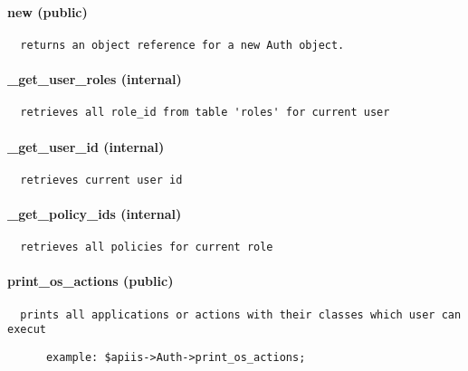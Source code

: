 \paragraph*{new (public)\label{Apiis::Auth::AppAuth_--_object_for_provading_data_about_user_access_rights_for_the_applications_new_public_}}
\begin{verbatim}
  returns an object reference for a new Auth object.
\end{verbatim}
\paragraph*{\_get\_user\_roles (internal)\label{Apiis::Auth::AppAuth_--_object_for_provading_data_about_user_access_rights_for_the_applications__get_user_roles_internal_}}
\begin{verbatim}
  retrieves all role_id from table 'roles' for current user
\end{verbatim}
\paragraph*{\_get\_user\_id (internal)\label{Apiis::Auth::AppAuth_--_object_for_provading_data_about_user_access_rights_for_the_applications__get_user_id_internal_}}
\begin{verbatim}
  retrieves current user id
\end{verbatim}
\paragraph*{\_get\_policy\_ids (internal)\label{Apiis::Auth::AppAuth_--_object_for_provading_data_about_user_access_rights_for_the_applications__get_policy_ids_internal_}}
\begin{verbatim}
  retrieves all policies for current role
\end{verbatim}
\paragraph*{print\_os\_actions (public)\label{Apiis::Auth::AppAuth_--_object_for_provading_data_about_user_access_rights_for_the_applications_print_os_actions_public_}}
\begin{verbatim}
  prints all applications or actions with their classes which user can execut
\end{verbatim}
\begin{verbatim}
      example: $apiis->Auth->print_os_actions;
\end{verbatim}
